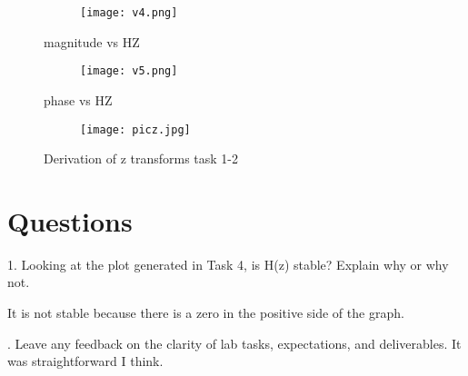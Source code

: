 \documentclass[12pt,a4paper]{article}
\begin{document}
\clearpage




\begin{figure}[h]
\centering
\begin{subfigure}{ 1\textwidth}
\texttt{[image: v4.png]}
\end{subfigure}
\caption{ magnitude vs HZ }
\label{fig2:image22}
\end{figure}



\begin{figure}[h]
\centering
\begin{subfigure}{ 1\textwidth}
\texttt{[image: v5.png]}
\end{subfigure}
\caption{ phase vs HZ }
\label{fig2:image22}
\end{figure}
\clearpage





\begin{figure}[h]
\centering
\begin{subfigure}{ 1\textwidth}
\texttt{[image: picz.jpg]}
\end{subfigure}
\caption{ Derivation of z transforms task 1-2 }
\label{fig2:image22}
\end{figure}
\clearpage






\section{Questions}\label{sec:res}


1. Looking at the plot generated in Task 4, is H(z) stable? Explain why or why not.

\newline It is not stable because there is a zero in the positive side of the graph.




. Leave any feedback on the clarity of lab tasks, expectations, and deliverables.\newline
\noindent It was straightforward I think.



\end{document}
